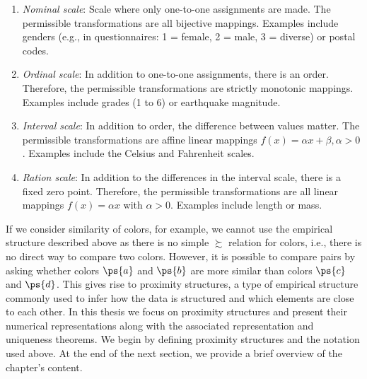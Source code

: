 \begin{defi}
	\leavevmode \vspace{-\baselineskip}
	\begin{enumerate}
		\item \emph{Nominal scale}: Scale where only one-to-one assignments are made. The permissible transformations are all bijective mappings. Examples include genders (e.g., in questionnaires: 1 = female, 2 = male, 3 = diverse) or postal codes.
		\item  \emph{Ordinal scale}: In addition to one-to-one assignments, there is an order. Therefore, the permissible transformations are strictly monotonic mappings. Examples include grades (1 to 6) or earthquake magnitude.
		\item \emph{Interval scale}: In addition to order, the difference between values matter. The permissible transformations are affine linear mappings $f(x) = \alpha x + \beta, \alpha > 0$. Examples include the Celsius and Fahrenheit scales.
		\item \emph{Ration scale}: In addition to the differences in the interval scale, there is a fixed zero point. Therefore, the permissible transformations are all linear mappings $f(x) = \alpha x$ with $\alpha > 0$. Examples include length or mass.
	\end{enumerate}
\end{defi}

If we consider similarity of colors, for example, we cannot use the empirical structure described above as there is no simple $\succsim$ relation for colors, i.e., there is no direct way to compare two colors.
However, it is possible to compare pairs by asking whether colors $\ps{a}$ and $\ps{b}$ are more similar than colors $\ps{c}$ and $\ps{d}$. This gives rise to proximity structures,  a type of empirical structure commonly used to infer how the data is structured and which elements are close to each other.
In this thesis we focus on proximity structures and present their numerical representations along with the associated representation and uniqueness theorems.
We begin by defining proximity structures and the notation used above. At the end of the next section, we provide a brief overview of the chapter's content.





